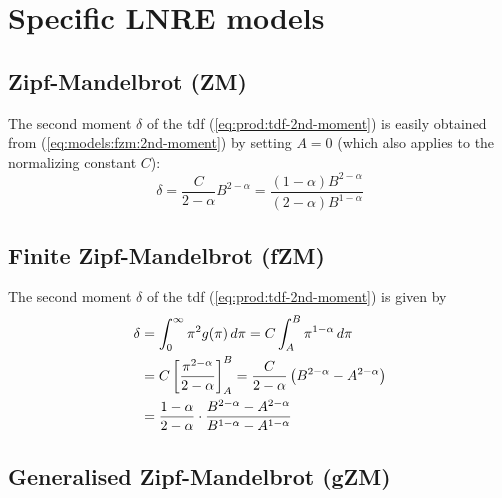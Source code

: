 \documentclass[a4paper]{article}
\begin{document}
\section{Specific LNRE models}
\label{sec:models}

\subsection{Zipf-Mandelbrot (ZM)}
\label{sec:models:zm}


The second moment $\delta$ of the tdf (\ref{eq:prod:tdf-2nd-moment}) is easily
obtained from (\ref{eq:models:fzm:2nd-moment}) by setting $A = 0$ (which also
applies to the normalizing constant $C$):
\begin{equation}
  \label{eq:models:zm:2nd-moment}
  \delta = \frac{C}{2 - \alpha} B^{2 - \alpha}
  = \frac{(1 - \alpha) B^{2 - \alpha}}{(2 - \alpha) B^{1 - \alpha}}
\end{equation}


\subsection{Finite Zipf-Mandelbrot (fZM)}
\label{sec:models:fzm}


The second moment $\delta$ of the tdf (\ref{eq:prod:tdf-2nd-moment}) is given
by
\begin{equation}
  \label{eq:models:fzm:2nd-moment}
  \begin{split}
    \delta & = \int_0^{\infty} \pi^2 g(\pi) \,d\pi
    = C \int_A^B \pi^{1-\alpha} \,d\pi \\
    & = C \left[ \frac{\pi^{2 - \alpha}}{2 - \alpha} \right]_A^B
    = \frac{C}{2 - \alpha} \left( B^{2 - \alpha} - A^{2 - \alpha} \right) \\
    & = \frac{1 - \alpha}{2 - \alpha}\cdot
    \frac{B^{2 - \alpha} - A^{2 - \alpha}}{B^{1 - \alpha} - A^{1 - \alpha}}
  \end{split}
\end{equation}

\subsection{Generalised Zipf-Mandelbrot (gZM)}
\label{sec:models:gzm}
\end{document}
